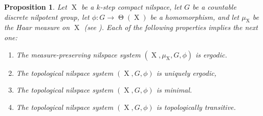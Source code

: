 \documentclass[a4paper,12pt,reqno]{amsart}
\newtheorem{proposition}[theorem]{Proposition}
\theoremstyle{definition}
\DeclareMathOperator{\tran}{\Theta}
\DeclareMathOperator{\ns}{X}
\begin{document}
\begin{proposition}\label{prop:topmeasconn}
Let $\ns$ be a $k$-step compact nilspace, let $G$ be a countable discrete nilpotent group, let $\phi:G\to \tran(\ns)$ be a homomorphism, and let $\mu_{\ns}$ be the Haar measure on $\ns$ \textup{(}see \cite[\S 2.2.2]{Cand:Notes2}\textup{)}. Each of the following properties implies the next one:
\begin{enumerate}
    \item The measure-preserving nilspace system $(\ns,\mu_{\ns},G,\phi)$ is ergodic.
    \item The topological nilspace system $(\ns,G,\phi)$ is uniquely ergodic,
    \item The topological nilspace system $(\ns,G,\phi)$ is minimal.
    \item The topological nilspace system $(\ns,G,\phi)$ is topologically transitive.
\end{enumerate}
\end{proposition}
\end{document}
